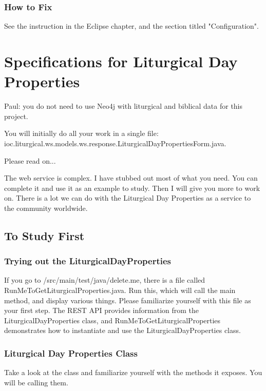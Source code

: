 \documentclass[]{memoir}
\begin{document}
\subsection{How to Fix}

See the instruction in the Eclipse chapter, and the section titled "Configuration".

\chapter{Specifications for Liturgical Day Properties}

Paul: you do not need to use Neo4j with liturgical and biblical data for this project.

You will initially do all your work in a single file: ioc.liturgical.ws.models.ws.response.LiturgicalDayPropertiesForm.java.

Please read on...

The web service is complex.  I have stubbed out most of what you need.  You can complete it and use it as an example to study.  Then I will give you more to work on.  There is a lot we can do with the Liturgical Day Properties as a service to the community worldwide.

\section{To Study First}

\subsection{Trying out the LiturgicalDayProperties}

If you go to /src/main/test/java/delete.me, there is a file called RunMeToGetLiturgicalProperties.java.  Run this, which will call the main method, and display various things.  Please familiarize yourself with this file as your first step.  The REST API provides information from the LiturgicalDayProperties class, and RunMeToGetLiturgicalProperties demonstrates how to instantiate and use the LiturgicalDayProperties class.

\subsection{Liturgical Day Properties Class}

Take a look at the class and familiarize yourself with the methods it exposes.  You will be calling them.  
\end{document}
